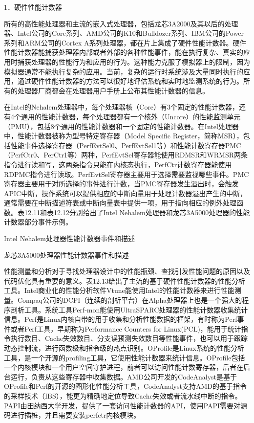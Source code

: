 \documentclass[]{ctexbook}
\begin{document}
1．硬件性能计数器

所有的高性能处理器和主流的嵌入式处理器，包括龙芯3A2000及其以后的处理器、Intel公司的Core系列、AMD公司的K10和Bulldozer系列、IBM公司的Power系列和ARM公司的Cortex A系列处理器，都在片上集成了硬件性能计数器。硬件性能计数器能捕获处理器内部或者外部的各种性能事件，能在执行复杂、真实的应用时捕获处理器的性能行为和应用的行为。这种能力克服了模拟器上的限制，因为模拟器通常不能执行复杂的应用。当前，复杂的运行时系统涉及大量同时执行的应用，通过硬件性能计数器的方法可以很好地评估系统和实时地监测系统的行为。所有的处理器厂商都会在处理器用户手册上公布其性能计数器的信息。

在Intel的Nehalem处理器中，每个处理器核（Core）有3个固定的性能计数器，还有4个通用的性能计数器，每个处理器都有一个核外（Uncore）的性能监测单元（PMU），包括8个通用的性能计数器和一个固定的性能计数器。在Intel处理器中，性能计数器被称为型号特定寄存器（Model Specific Register，简称MSR），包括性能事件选择寄存器（PerfEvtSel0、PerfEvtSel1等）和性能计数寄存器PMC（PerfCtr0、PerCtr1等）两种，PerfEvtSel寄存器能使用RDMSR和WRMSR两条指令进行读和写，这两条指令只能在内核态执行，PerfCtr计数寄存器能使用RDPMC指令进行读取。PerfEvtSel寄存器主要用于选择需要监视哪些事件。PMC寄存器主要用于对所选择的事件进行计数，当PMC寄存器发生溢出时，会触发APIC中断，操作系统可以提供相应的中断向量用于处理计数器溢出产生的中断，通常需要在中断描述符表或中断向量表中提供一项，用于指向相应的例外处理函数。表12.11和表12.12分别给出了Intel Nehalem处理器和龙芯3A5000处理器的性能计数器部分事件示例。

\label{tab:perf-event-nehalem}Intel Nehalem处理器性能计数器事件和描述

\label{tab:perf-event-3A5000}龙芯3A5000处理器性能计数器事件和描述

性能测量和分析对于寻找处理器设计中的性能瓶颈、查找引发性能问题的原因以及代码优化具有重要的意义。表12.13给出了主流的基于硬件性能计数器的性能分析工具。Intel商业化的性能分析软件Vtune能使用Intel的性能计数器来进行性能测量。Compaq公司的DCPI（连续的剖析平台）在Alpha处理器上也是一个强大的程序剖析工具。系统工具Perf-mon能使用UltraSPARC处理器的性能计数器收集统计信息。Perf是Linux内核自带的用于收集和分析性能数据的框架，有时称为Perf事件或者Perf工具，早期称为Performance Counters for Linux(PCL)，能用于统计指令执行数目、Cache失效数目、分支误预测失效数目等性能事件，也可以用于跟踪动态控制流，进行函数级和指令级的热点识别。OProfile是Linux系统的性能分析工具，是一个开源的profiling工具，它使用性能计数器来统计信息。OProfile包括一个内核模块和一个用户空间守护进程，前者可以访问性能计数寄存器，后者在后台运行，负责从这些寄存器中收集数据。AMD公司开发的CodeAnalyst是基于OProfile和Perf的开源的图形化性能分析工具，CodeAnalyst支持AMD的基于指令的采样技术（IBS），能更为精确地定位导致Cache失效或者流水线中断的指令。PAPI由田纳西大学开发，提供了一套访问性能计数器的API，使用PAPI需要对源码进行插桩，并且需要安装perfctr内核模块。
\end{document}
